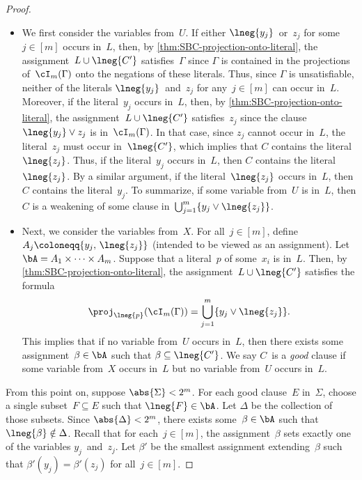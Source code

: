 \documentclass[12pt]{article}
\begin{document}
\begin{proof}
  \begin{itemize}
  \item We first consider the variables from~$U$.
    If either $\lneg{y_j}$~or~$z_j$ for some~$j \in [m]$ occurs in~$L$,
    then, by \cref{thm:SBC-projection-onto-literal},
    the assignment~$L \cup \lneg{C'}$ satisfies~$\Gamma$
    since $\Gamma$ is contained in the projections
    of~$\cI_m(\Gamma)$ onto the negations of these literals.
    Thus, since $\Gamma$ is unsatisfiable,
    neither of the literals $\lneg{y_j}$~and~$z_j$
    for any~$j \in [m]$ can occur in~$L$.
    Moreover, if the literal~$y_j$ occurs in~$L$,
    then, by \cref{thm:SBC-projection-onto-literal},
    the assignment~$L \cup \lneg{C'}$ satisfies~$z_j$
    since the clause~$\lneg{y_j} \lor z_j$ is in~$\cI_m(\Gamma)$.
    In that case, since $z_j$ cannot occur in~$L$,
    the literal~$z_j$ must occur in~$\lneg{C'}$,
    which implies that $C$ contains the literal~$\lneg{z_j}$.
    Thus, if the literal~$y_j$ occurs in~$L$,
    then $C$ contains the literal~$\lneg{z_j}$.
    By a similar argument, if the literal~$\lneg{z_j}$ occurs in~$L$,
    then $C$ contains the literal~$y_j$.
    To summarize, if some variable from~$U$ is in~$L$,
    then $C$ is a weakening of some clause
    in~$\bigcup_{j = 1}^m \{y_j \lor \lneg{z_j}\}$.
  \item Next, we consider the variables from~$X$.
    For all~$j \in [m]$, define $A_j \coloneqq \{y_j,\, \lneg{z_j}\}$
    (intended to be viewed as an assignment).
    Let $\bA = A_1 \times \dots \times A_m$.
    Suppose that a literal~$p$ of some~$x_i$ is in~$L$.
    Then, by \cref{thm:SBC-projection-onto-literal},
    the assignment~$L \cup \lneg{C'}$ satisfies the formula
    \begin{equation*}
      \proj_{\lneg{p}}(\cI_m(\Gamma)) = \bigcup_{j = 1}^m \{y_j \lor \lneg{z_j}\}.
    \end{equation*}
    This implies that if no variable from~$U$ occurs in~$L$,
    then there exists some assignment~$\beta \in \bA$
    such that $\beta \subseteq \lneg{C'}$.
    We say $C$~is a \emph{good} clause
    if some variable from~$X$ occurs in~$L$
    but no variable from~$U$ occurs in~$L$.
  \end{itemize}

  From this point on, suppose $\abs{\Sigma} < 2^m$.
  For each good clause~$E$ in~$\Sigma$,
  choose a single subset~$F \subseteq E$ such that $\lneg{F} \in \bA$.
  Let $\Delta$ be the collection of those subsets.
  Since $\abs{\Delta} < 2^m$, there exists some~$\beta \in \bA$
  such that $\lneg{\beta} \notin \Delta$.
  Recall that for each~$j \in [m]$, the assignment~$\beta$
  sets exactly one of the variables $y_j$~and~$z_j$.
  Let $\beta'$ be the smallest assignment extending~$\beta$
  such that $\beta'(y_j) = \beta'(z_j)$ for all~$j \in [m]$.


\end{proof}
\end{document}
